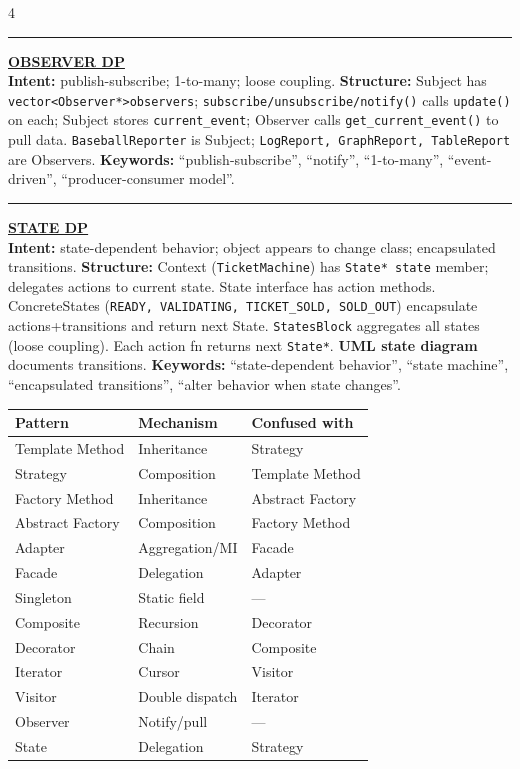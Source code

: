 \documentclass[landscape,letterpaper]{article}
\newcommand{\h}[1]{\textbf{#1}}
\newcommand{\hd}[1]{\vspace{1pt}\noindent\textbf{\underline{#1}}\vspace{-1pt}}
\begin{document}
\begin{multicols}{4}
\vspace{-1pt}\noindent\rule{\columnwidth}{0.2pt}\vspace{-3pt}

\hd{OBSERVER DP}\\[-2pt]
\h{Intent:} publish-subscribe; 1-to-many; loose coupling. \h{Structure:} Subject has \texttt{vector\textless Observer*\textgreater observers}; \texttt{subscribe/unsubscribe/notify()} calls \texttt{update()} on each; Subject stores \texttt{current\_event}; Observer calls \texttt{get\_current\_event()} to pull data. \texttt{BaseballReporter} is Subject; \texttt{LogReport, GraphReport, TableReport} are Observers. \h{Keywords:} ``publish-subscribe'', ``notify'', ``1-to-many'', ``event-driven'', ``producer-consumer model''.\\[-2pt]

\vspace{-1pt}\noindent\rule{\columnwidth}{0.2pt}\vspace{-3pt}

\hd{STATE DP}\\[-2pt]
\h{Intent:} state-dependent behavior; object appears to change class; encapsulated transitions. \h{Structure:} Context (\texttt{TicketMachine}) has \texttt{State* state} member; delegates actions to current state. State interface has action methods. ConcreteStates (\texttt{READY, VALIDATING, TICKET\_SOLD, SOLD\_OUT}) encapsulate actions+transitions and return next State. \texttt{StatesBlock} aggregates all states (loose coupling). Each action fn returns next \texttt{State*}. \h{UML state diagram} documents transitions. \h{Keywords:} ``state-dependent behavior'', ``state machine'', ``encapsulated transitions'', ``alter behavior when state changes''.\\[-2pt]

\vspace{-3pt}
{\fontsize{5.8}{6.6}\selectfont
\begin{tabular}{@{}p{0.65in}p{0.65in}p{0.65in}@{}}
\toprule
\textbf{Pattern} & \textbf{Mechanism} & \textbf{Confused with}\\
\midrule
Template Method & Inheritance & Strategy\\
Strategy & Composition & Template Method\\
Factory Method & Inheritance & Abstract Factory\\
Abstract Factory & Composition & Factory Method\\
Adapter & Aggregation/MI & Facade\\
Facade & Delegation & Adapter\\
Singleton & Static field & ---\\
Composite & Recursion & Decorator\\
Decorator & Chain & Composite\\
Iterator & Cursor & Visitor\\
Visitor & Double dispatch & Iterator\\
Observer & Notify/pull & ---\\
State & Delegation & Strategy\\
\bottomrule
\end{tabular}
}

\end{multicols}
\end{document}
